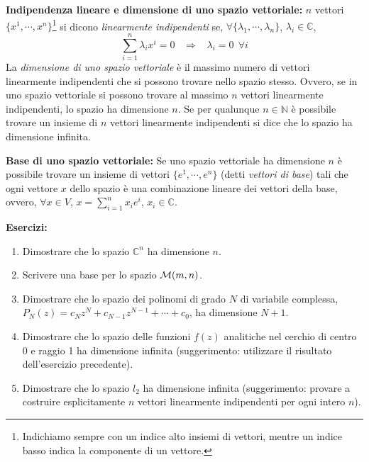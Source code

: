 \documentclass[a4paper,10pt]{article}
\newcommand{\linea}{\vskip14pt \noindent}
\begin{document}
\linea
{\bf Indipendenza lineare e dimensione di uno spazio vettoriale:} $n$ vettori 
$\{ x^1,\cdots,x^n \}$\footnote{Indichiamo sempre con un indice alto insiemi di vettori,
mentre un indice basso
indica la componente di un vettore.}
si dicono {\it linearmente indipendenti} se, $\forall \{\lambda_1,\cdots,\lambda_n\}$,
$\lambda_i \in \mathbb{C}$,
\begin{equation}
\sum_{i=1}^n \lambda_i x^i = 0 \hspace{10pt}  \Rightarrow  \hspace{10pt} \lambda_i = 0 \ \  \forall i
\end{equation}
La {\it dimensione di uno spazio vettoriale} \`e il massimo numero di vettori linearmente
indipendenti che si possono trovare nello spazio stesso. Ovvero, se in uno spazio vettoriale si
possono trovare al massimo $n$ vettori linearmente indipendenti, lo spazio ha dimensione $n$.
Se per qualunque $n \in \mathbb{N}$ \`e possibile trovare un insieme di $n$ vettori linearmente 
indipendenti si dice che lo spazio ha dimensione infinita.

\linea
{\bf Base di uno spazio vettoriale:} Se uno spazio vettoriale ha dimensione $n$ \`e possibile
trovare un insieme di vettori $\{e^1,\cdots,e^n\}$ (detti {\it vettori di base}) 
tali che ogni vettore $x$ dello spazio \`e una combinazione lineare dei vettori della base,
ovvero, $\forall x \in V$, $x=\sum_{i=1}^n x_i e^i$, $x_i \in \mathbb{C}$.

\linea
{\bf Esercizi:}
\begin{enumerate}
\item Dimostrare che lo spazio $\mathbb{C}^n$ ha dimensione $n$.
\item Scrivere una base per lo spazio ${\cal M}(m,n)$.
\item Dimostrare che lo spazio dei polinomi di grado $N$ di variabile complessa, 
$P_N(z) = c_N z^N + c_{N-1} z^{N-1} + \cdots + c_0$, ha dimensione $N+1$.
\item Dimostrare che lo spazio delle funzioni $f(z)$ analitiche nel cerchio di centro 0 e 
raggio 1 ha dimensione infinita (suggerimento: utilizzare il risultato dell'esercizio precedente).
\item Dimostrare che lo spazio $l_2$ ha dimensione infinita (suggerimento: provare a costruire
esplicitamente $n$ vettori linearmente indipendenti per ogni intero $n$).
\end{enumerate}
\end{document}
